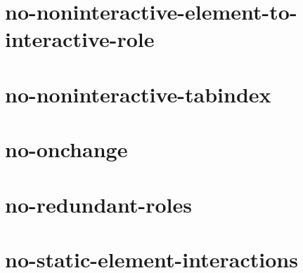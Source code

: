 \documentclass[twoside]{book}
\newcommand{\+}{\discretionary{\mbox{\scriptsize$\hookleftarrow$}}{}{}}
\begin{document}
\chapter{no-\/noninteractive-\/element-\/to-\/interactive-\/role}
\label{md__c_1_workspace_demo_src_main_script_node_modules_eslint-plugin-jsx-a11y_docs_rules_no-noninte6eeb8b3f3986a009c671fc89136ef4ff}

\chapter{no-\/noninteractive-\/tabindex}
\label{md__c_1_workspace_demo_src_main_script_node_modules_eslint-plugin-jsx-a11y_docs_rules_no-noninteractive-tabindex}

\chapter{no-\/onchange}
\label{md__c_1_workspace_demo_src_main_script_node_modules_eslint-plugin-jsx-a11y_docs_rules_no-onchange}

\chapter{no-\/redundant-\/roles}
\label{md__c_1_workspace_demo_src_main_script_node_modules_eslint-plugin-jsx-a11y_docs_rules_no-redundant-roles}

\chapter{no-\/static-\/element-\/interactions}
\label{md__c_1_workspace_demo_src_main_script_node_modules_eslint-plugin-jsx-a11y_docs_rules_no-static-element-interactions}

\end{document}
